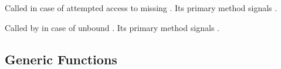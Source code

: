 \begin{LIST}{1cm}
  {
  Called in case of attempted access to missing . Its primary
  method signals .
  }

  {
  Called by  in case of unbound . Its primary
  method signals .
  }

\end{LIST}


\subsection[Generic~Functns]{Generic Functions} 

